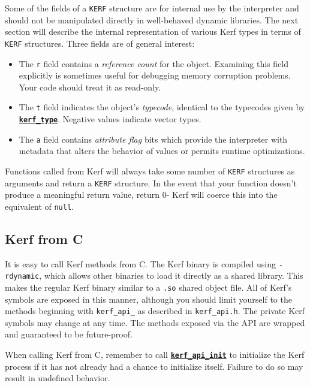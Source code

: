 \documentclass{article}
\newcommand{\primu}[2]{\hyperref[prim:#2]{\textbf{\texttt{#1}}}}
\newcommand{\ffi}[2]{\hyperref[ffi:#2]{\textbf{\texttt{#1}}}}
\begin{document}
Some of the fields of a \texttt{KERF} structure are for internal use by the interpreter and should not be manipulated directly in well-behaved dynamic libraries. The next section will describe the internal representation of various Kerf types in terms of \texttt{KERF} structures. Three fields are of general interest:

\begin{itemize}
	\item The \texttt{r} field contains a \emph{reference count} for the object. Examining this field explicitly is sometimes useful for debugging memory corruption problems. Your code should treat it as read-only.
	\item The \texttt{t} field indicates the object's \emph{typecode}, identical to the typecodes given by \primu{kerf\_type}{kerfType}. Negative values indicate vector types.
	\item The \texttt{a} field contains \emph{attribute flag} bits which provide the interpreter with metadata that alters the behavior of values or permits runtime optimizations.
\end{itemize}

Functions called from Kerf will always take some number of \texttt{KERF} structures as arguments and return a \texttt{KERF} structure. In the event that your function doesn't produce a meaningful return value, return 0- Kerf will coerce this into the equivalent of \texttt{null}.

\pagebreak
\subsection{Kerf from C}

It is easy to call Kerf methods from C. The Kerf binary is compiled using \texttt{-rdynamic},  which allows other binaries to load it directly as a shared library. This makes the regular Kerf binary similar to a \texttt{.so} shared object file. All of Kerf's symbols are exposed in this manner, although you should limit yourself to the methods beginning with \texttt{kerf\_api\_} as described in \texttt{kerf\_api.h}. The private Kerf symbols may change at any time. The methods exposed via the API are wrapped and guaranteed to be future-proof. 
\vspace{0.5cm}

When calling Kerf from C, remember to call \ffi{kerf\_api\_init}{kerfApiInit} to initialize the Kerf process if it has not already had a chance to initialize itself. Failure to do so may result in undefined behavior.
\end{document}

